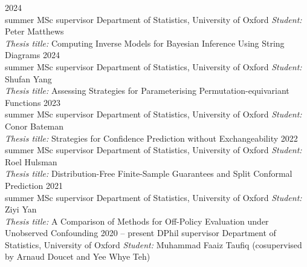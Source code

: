 \documentclass[9pt]{developercv} %
\begin{document}
\begin{entrylist}
    \entry
        {2024\\\footnotesize{summer}}
        {MSc supervisor}
        {Department of Statistics, University of Oxford}
        {\emph{Student:} Peter Matthews \\ \emph{Thesis title:} Computing Inverse Models for Bayesian Inference Using String Diagrams}
    \entry
        {2024\\\footnotesize{summer}}
        {MSc supervisor}
        {Department of Statistics, University of Oxford}
        {\emph{Student:} Shufan Yang \\ \emph{Thesis title:} Assessing Strategies for Parameterising Permutation-equivariant Functions}
    \entry
        {2023\\\footnotesize{summer}}
        {MSc supervisor}
        {Department of Statistics, University of Oxford}
        {\emph{Student:} Conor Bateman \\ \emph{Thesis title:} Strategies for Confidence Prediction without Exchangeability}
    \entry
        {2022\\\footnotesize{summer}}
        {MSc supervisor}
        {Department of Statistics, University of Oxford}
        {\emph{Student:} Roel Hulsman \\ \emph{Thesis title:} Distribution-Free Finite-Sample Guarantees and Split Conformal Prediction}
    \entry
        {2021\\\footnotesize{summer}}
        {MSc supervisor}
        {Department of Statistics, University of Oxford}
        {\emph{Student:} Ziyi Yan \\ \emph{Thesis title:} A Comparison of Methods for Off-Policy Evaluation under Unobserved Confounding}
    \entry
        {2020 -- present}
        {DPhil supervisor}
        {Department of Statistics, University of Oxford}
        {\emph{Student:} Muhammad Faaiz Taufiq (cosupervised by Arnaud Doucet and Yee Whye Teh)}
\end{entrylist}

\vspace{-1em}

\end{document}
